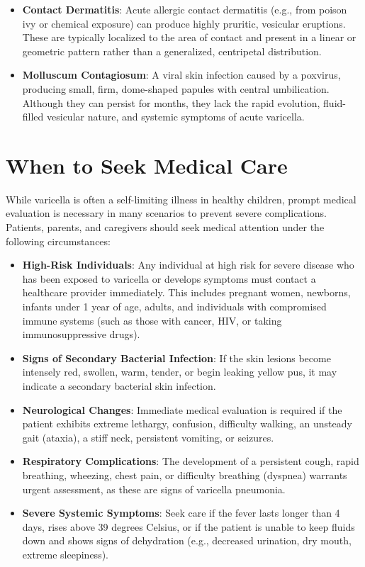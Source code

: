 \begin{itemize}
    \item \textbf{Contact Dermatitis}: Acute allergic contact dermatitis (e.g., from poison ivy or chemical exposure) can produce highly pruritic, vesicular eruptions. These are typically localized to the area of contact and present in a linear or geometric pattern rather than a generalized, centripetal distribution.
    \item \textbf{Molluscum Contagiosum}: A viral skin infection caused by a poxvirus, producing small, firm, dome-shaped papules with central umbilication. Although they can persist for months, they lack the rapid evolution, fluid-filled vesicular nature, and systemic symptoms of acute varicella.
\end{itemize}

\section*{When to Seek Medical Care}
While varicella is often a self-limiting illness in healthy children, prompt medical evaluation is necessary in many scenarios to prevent severe complications. Patients, parents, and caregivers should seek medical attention under the following circumstances:

\begin{itemize}
    \item \textbf{High-Risk Individuals}: Any individual at high risk for severe disease who has been exposed to varicella or develops symptoms must contact a healthcare provider immediately. This includes pregnant women, newborns, infants under 1 year of age, adults, and individuals with compromised immune systems (such as those with cancer, HIV, or taking immunosuppressive drugs).
    \item \textbf{Signs of Secondary Bacterial Infection}: If the skin lesions become intensely red, swollen, warm, tender, or begin leaking yellow pus, it may indicate a secondary bacterial skin infection.
    \item \textbf{Neurological Changes}: Immediate medical evaluation is required if the patient exhibits extreme lethargy, confusion, difficulty walking, an unsteady gait (ataxia), a stiff neck, persistent vomiting, or seizures.
    \item \textbf{Respiratory Complications}: The development of a persistent cough, rapid breathing, wheezing, chest pain, or difficulty breathing (dyspnea) warrants urgent assessment, as these are signs of varicella pneumonia.
    \item \textbf{Severe Systemic Symptoms}: Seek care if the fever lasts longer than 4 days, rises above 39 degrees Celsius, or if the patient is unable to keep fluids down and shows signs of dehydration (e.g., decreased urination, dry mouth, extreme sleepiness).
\end{itemize}

